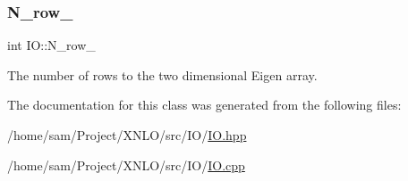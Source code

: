 \subsubsection{\texorpdfstring{N\_row\_}{N\_row\_}}
{\footnotesize\ttfamily int I\+O\+::\+N\+\_\+row\+\_\+}

The number of rows to the two dimensional Eigen array. 

The documentation for this class was generated from the following files\+:\begin{DoxyCompactItemize}
\item 
/home/sam/\+Project/\+X\+N\+L\+O/src/\+I\+O/\mbox{\hyperlink{_i_o_8hpp}{I\+O.\+hpp}}\item 
/home/sam/\+Project/\+X\+N\+L\+O/src/\+I\+O/\mbox{\hyperlink{_i_o_8cpp}{I\+O.\+cpp}}\end{DoxyCompactItemize}

